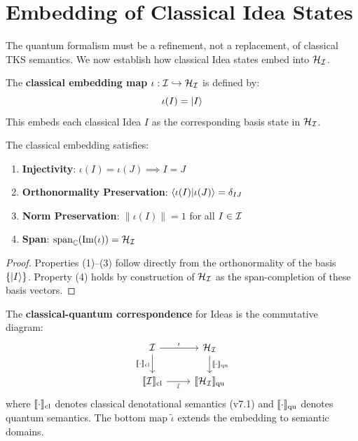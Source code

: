 \section{Embedding of Classical Idea States}
\label{sec:classical-embedding}

The quantum formalism must be a refinement, not a replacement, of classical TKS semantics. We now establish how classical Idea states embed into $\mathcal{H}_{\mathcal{I}}$.

\begin{definition}
\label{def:classical-embedding}
The \textbf{classical embedding map} $\iota : \mathcal{I} \hookrightarrow \mathcal{H}_{\mathcal{I}}$ is defined by:
\[
\iota(I) = |I\rangle
\]
This embeds each classical Idea $I$ as the corresponding basis state in $\mathcal{H}_{\mathcal{I}}$.
\end{definition}

\begin{proposition}
\label{prop:embedding-props}
The classical embedding satisfies:
\begin{enumerate}
  \item \textbf{Injectivity}: $\iota(I) = \iota(J) \implies I = J$
  \item \textbf{Orthonormality Preservation}: $\langle \iota(I) | \iota(J) \rangle = \delta_{IJ}$
  \item \textbf{Norm Preservation}: $\|\iota(I)\| = 1$ for all $I \in \mathcal{I}$
  \item \textbf{Span}: $\mathrm{span}_{\mathbb{C}}(\mathrm{Im}(\iota)) = \mathcal{H}_{\mathcal{I}}$
\end{enumerate}
\end{proposition}

\begin{proof}
Properties (1)--(3) follow directly from the orthonormality of the basis $\{|I\rangle\}$. Property (4) holds by construction of $\mathcal{H}_{\mathcal{I}}$ as the span-completion of these basis vectors.
\end{proof}

\begin{definition}
\label{def:cq-correspondence}
The \textbf{classical-quantum correspondence} for Ideas is the commutative diagram:
\[
\begin{tikzcd}
\Ideas \arrow[r, "\iota"] \arrow[d, "\sem{\cdot}_{\mathrm{cl}}"'] & \Hspace_{\Ideas} \arrow[d, "\sem{\cdot}_{\mathrm{qu}}"] \\
\sem{\Ideas}_{\mathrm{cl}} \arrow[r, "\tilde{\iota}"'] & \sem{\Hspace_{\Ideas}}_{\mathrm{qu}}
\end{tikzcd}
\]
where $\llbracket \cdot \rrbracket_{\mathrm{cl}}$ denotes classical denotational semantics (v7.1) and $\llbracket \cdot \rrbracket_{\mathrm{qu}}$ denotes quantum semantics. The bottom map $\tilde{\iota}$ extends the embedding to semantic domains.
\end{definition}


